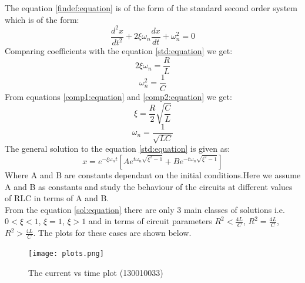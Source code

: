 \documentclass[12pt,a4paper]{report}
\begin{document}
The equation \textcolor{blue}{\ref{findef:equation}} is of the form of the standard second order system which
is of the form:
\begin{equation}
\frac{d^2x}{dt^2}+2\xi \omega_n\frac{dx}{dt}+\omega_n ^2=0
\label{std:equation}
\end{equation}
Comparing coefficients with the equation \textcolor{blue}{\ref{std:equation}} we get:
\begin{equation}
2\xi\omega_n=\frac{R}{L}
\label{comp1:equation}
\end{equation}
\begin{equation}
\omega_n ^2=\frac{1}{C}
\label{comp2:equation}
\end{equation}
From equations \textcolor{blue}{\ref{comp1:equation}} and \textcolor{blue}{\ref{comp2:equation}} we get:
\begin{equation}
\xi=\frac{R}{2}\sqrt{\frac{C}{L}}
\label{compres1:equation}
\end{equation}
\begin{equation}
\omega_n=\frac{1}{\sqrt{LC}}
\label{compres2:equation}
\end{equation}
The general solution to the equation \textcolor{blue}{\ref{std:equation}} is given as:
\begin{equation}
x=e^{-\xi\omega_nt} [Ae^{t\omega_n\sqrt{\xi^2 - 1}}+Be^{-t\omega_n\sqrt{\xi^2 - 1}}]
\label{sol:equation}
\end{equation}
Where A and B are constants dependant on the initial conditions.Here we assume A and B as constants
and study the behaviour of the circuits at different values of RLC in terms of A and B.\\ From the equation
\textcolor{blue}{\ref{sol:equation}} there are only 3 main classes of solutions i.e. $0<\xi<1$, $\xi=1$, $\xi>1$
and in terms of circuit parameters $R^2<\frac{4L}{C}$, $R^2=\frac{4L}{C}$, $R^2>\frac{4L}{C}$. The plots for
these cases are shown below.
\begin{figure}[ht!]
\texttt{[image: plots.png]}
\caption{The current vs time plot (130010033)}
\label{fig:plot}
\end{figure}

\end{document}
